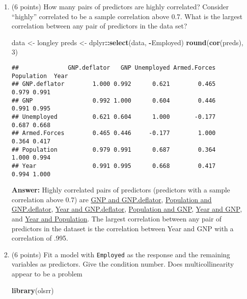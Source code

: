 \documentclass[
]{article}
\newenvironment{Shaded}{\begin{snugshade}}{\end{snugshade}}
\newcommand{\DecValTok}[1]{\textcolor[rgb]{0.00,0.00,0.81}{#1}}
\newcommand{\FunctionTok}[1]{\textcolor[rgb]{0.13,0.29,0.53}{\textbf{#1}}}
\newcommand{\NormalTok}[1]{#1}
\newcommand{\OtherTok}[1]{\textcolor[rgb]{0.56,0.35,0.01}{#1}}
\newcommand{\SpecialCharTok}[1]{\textcolor[rgb]{0.81,0.36,0.00}{\textbf{#1}}}
\begin{document}
\begin{enumerate}
\def\labelenumi{\arabic{enumi}.}
\item
  (6 points) How many pairs of predictors are highly correlated?
  Consider ``highly'' correlated to be a sample correlation above 0.7.
  What is the largest correlation between any pair of predictors in the
  data set?

\begin{Shaded}
\begin{Highlighting}[]
\NormalTok{data }\OtherTok{\textless{}{-}}\NormalTok{ longley}
\NormalTok{preds }\OtherTok{\textless{}{-}}\NormalTok{ dplyr}\SpecialCharTok{::}\FunctionTok{select}\NormalTok{(data, }\SpecialCharTok{{-}}\NormalTok{Employed)}
\FunctionTok{round}\NormalTok{(}\FunctionTok{cor}\NormalTok{(preds), }\DecValTok{3}\NormalTok{)}
\end{Highlighting}
\end{Shaded}

\begin{verbatim}
##              GNP.deflator   GNP Unemployed Armed.Forces Population  Year
## GNP.deflator        1.000 0.992      0.621        0.465      0.979 0.991
## GNP                 0.992 1.000      0.604        0.446      0.991 0.995
## Unemployed          0.621 0.604      1.000       -0.177      0.687 0.668
## Armed.Forces        0.465 0.446     -0.177        1.000      0.364 0.417
## Population          0.979 0.991      0.687        0.364      1.000 0.994
## Year                0.991 0.995      0.668        0.417      0.994 1.000
\end{verbatim}

  \textbf{Answer:} Highly correlated pairs of predictors (predictors
  with a sample correlation above 0.7) are \ul{GNP and GNP.deflator},
  \ul{Population and GNP.deflator}, \ul{Year and GNP.deflator},
  \ul{Population and GNP}, \ul{Year and GNP}, and \ul{Year and
  Population}. The largest correlation between any pair of predictors in
  the dataset is the correlation between Year and GNP with a correlation
  of .995.
\item
  (6 points) Fit a model with \texttt{Employed} as the response and the
  remaining variables as predictors. Give the condition number. Does
  multicollinearity appear to be a problem

\begin{Shaded}
\begin{Highlighting}[]
\FunctionTok{library}\NormalTok{(olsrr)}
\end{Highlighting}
\end{Shaded}


\end{enumerate}
\end{document}

